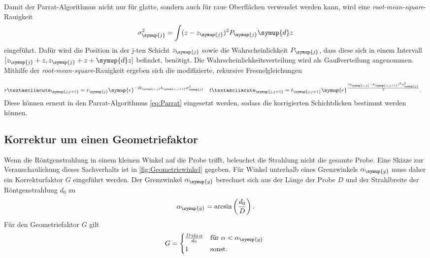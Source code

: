 Damit der Parrat-Algorithmus nicht nur für glatte, sondern auch für raue Oberflächen verwendet werden kann, wird eine \textit{root-mean-square}-Rauigkeit 
\begin{equation*}
    \sigma_{\symup{j}}^2 = \int (z-z_{\symup{j}})^2 P_{\symup{j}}\symup{d}z
\end{equation*}
eingeführt. Dafür wird die Position in der j-ten Schicht $z_{\symup{j}}$ sowie die Wahrscheinlichkeit $P_{\symup{j}}$, dass diese sich in einem Intervall 
$[z_{\symup{j}}+z, z_{\symup{j}}+z+\symup{d}z]$ befindet, benötigt. Die Wahrscheinlichkeitsverteilung wird als Gaußverteilung angenommen.
Mithilfe der \textit{root-mean-square}-Rauigkeit ergeben sich die modifizierte, rekursive Fresnelgleichungen

\begin{align*}
    r´_{\symup{j,j+1}} &= r_{\symup{j}}\symup{e}^{-2k_{\symup{z,j}}k_{\symup{z,j+1}}\sigma_{\symup{j}}^2} & t´_{\symup{j,j+1}} &= t_{\symup{j,j+1}}\symup{e}^{\frac{(k_{\symup{z,j}}-k_{\symup{z,j+1}})^2\sigma_{\symup{j}}^2}{2}}.
\end{align*}
Diese können erneut in den Parrat-Algorithmus \autoref{eq:Parrat} eingesetzt werden, sodass die korrigierten Schichtdicken bestimmt werden können.

\subsection{Korrektur um einen Geometriefaktor}
Wenn die Röntgenstrahlung in einem kleinen Winkel auf die Probe trifft, beleuchet die Strahlung nicht die gesamte Probe. Eine Skizze zur Veranschaulichung dieses Sachverhalts ist in
\autoref{fig:Geometriewinkel} gegeben. Für Winkel unterhalb eines Grenzwinkels $\alpha_{\symup{g}}$ muss daher ein Korrekturfaktor $G$ eingeführt werden.
Der Grenzwinkel $\alpha_{\symup{g}}$ berechnet sich aus der Länge der Probe $D$ und der Strahlbreite der Röntgenstrahlung $d_0$ zu
\begin{equation*}
    \alpha_{\symup{g}} = \arcsin \left(\frac{d_0}{D}\right).
\end{equation*}
Für den Geometriefaktor $G$ gilt
\begin{equation}
    G = 
    \begin{cases*}
        \frac{D\sin \alpha}{d_0}  & für $\alpha < \alpha_{\symup{g}}$ \\
        1 & sonst.
    \end{cases*}
    \label{eq:Geometriefaktor}
\end{equation}

